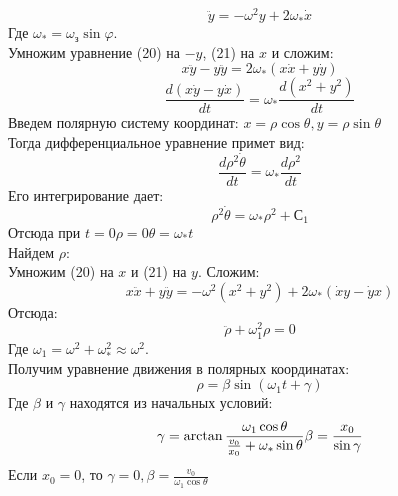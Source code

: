 \begin{equation}
\ddot{y} = - \omega^{2}y + 2\omega_{*}\dot{x}
\end{equation}
Где $\omega_{*} = \omega_{з}\sin\varphi$.\\
Умножим уравнение (20) на $-y$, (21) на $x$ и сложим:
\begin{equation}
x\ddot{y} - y\ddot{y} = 2\omega_{*}(x\dot{x} + y\dot{y})
\end{equation}
\begin{equation}
\frac{d(x\dot{y} - y\dot{x})}{dt}  = \omega_{*}\frac{d(x^2 + y^2)}{dt}
\end{equation}
Введем полярную систему координат: $x = \rho\cos\theta, y = \rho\sin\theta $\\
Тогда дифференциальное уравнение примет вид:
\begin{equation}
\frac{d\rho^2\dot{\theta}}{dt}  = \omega_{*}\frac{d\rho^2}{dt}
\end{equation}
Его интегрирование дает:
\begin{equation}
\rho^2\dot{\theta}  = \omega_{*}\rho^2 + С_1
\end{equation}
Отсюда при $t =0 \rho = 0   \theta = \omega_{*}t $\\
Найдем $\rho$:\\
Умножим (20) на $x$ и (21) на $y$. Сложим:
\begin{equation}
x\ddot{x} + y\ddot{y} = -\omega^{2}(x^2 + y^2) + 2\omega_{*}(\dot{x}y - \dot{y}x)
\end{equation}
Отсюда:
\begin{equation}
\ddot{\rho} + \omega_{1}^{2}\rho = 0
\end{equation}
Где $\omega_{1} = \omega^2 + \omega_{*}^2 \approx \omega^2$.\\
Получим уравнение движения  в полярных координатах:
\begin{equation}
\rho = \beta\sin(\omega_{1}t+ \gamma)
\end{equation}
Где $\beta$ и $\gamma$ находятся из начальных условий:
\begin{equation}
\gamma = \arctan\frac{\omega_{1}\cos\theta}{\frac{v_0}{x_0} + \omega_{*}\sin\theta}\\
\beta = \frac{x_0}{\sin\gamma}
\end{equation}
Если $x_0 = 0$, то $\gamma = 0, \beta = \frac{v_0}{\omega_{1}\cos\theta}$
